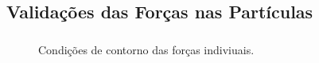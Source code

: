 \documentclass{beamer}
\begin{document}
\subsection*{Validações das Forças nas Partículas}
\begin{frame}
  \frametitle{\subsecname}
  
  \begin{minipage}{.48\textwidth}
    \centering
    \begin{figure}
       {\raggedleft \tiny Condições de contorno das forças indiviuais.}
    \end{figure}
  \end{minipage}
  \hfill
  \begin{minipage}{.48\textwidth}
    \begin{figure}
\end{figure}
\end{minipage}
\end{frame}
\end{document}
